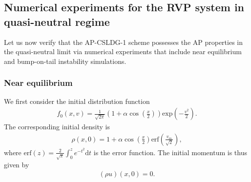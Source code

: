 \documentclass[letterpaper,10pt]{article}
\numberwithin{equation}{section}
\numberwithin{figure}{section}
\numberwithin{table}{section}
\begin{document}



\subsection{Numerical experiments for the RVP system in quasi-neutral regime}
\hspace{4pt}
Let us now verify that the AP-CSLDG-1 scheme possesses the AP properties in the quasi-neutral limit via numerical experiments that include near equilibrium and bump-on-tail instability simulations.
\subsubsection{Near equilibrium}
\hspace{4pt}
We first consider the initial distribution function
\begin{align*}
    f_0(x,v)=\frac{1}{\sqrt{2\pi}}(1+\alpha\cos(\frac{x}{2}))\text{exp}(-\frac{v^2}{2}).
\end{align*}
The corresponding initial density is 
\begin{align*}
    \rho(x,0)=1+\alpha\cos(\frac{x}{2})\text{erf}(\frac{v_m}{\sqrt{2}}),
\end{align*}
where $\text{erf}(z)=\frac{2}{\sqrt{\pi}}\int_0^ze^{-t^2}\mathrm dt$ is the error function. 
The initial momentum is thus given by
\begin{align*}
    (\rho u)(x,0)=0.
\end{align*}
\end{document}
